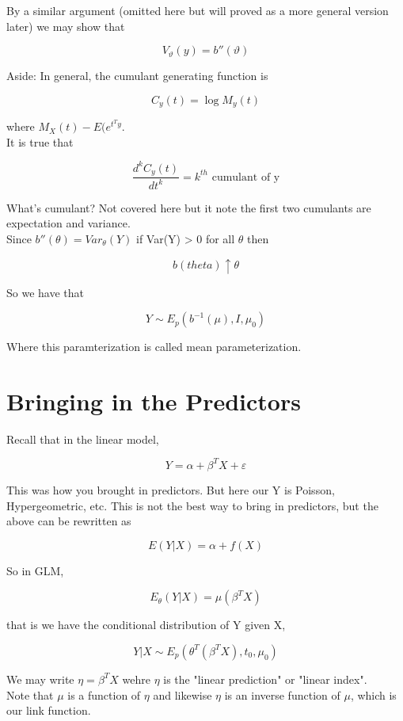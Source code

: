 \documentclass[11pt,fleqn]{book} %
\begin{document}
By a similar argument (omitted here but will proved as a more general version later) we may show that

		$$V_\vartheta(y) = b''(\vartheta) $$

Aside: In general, the cumulant generating function is 

		$$ C_y(t) = \log M_y(t)$$

where $M_X(t) - E(e^{t^T y}$.\\

It is true that

		$$\frac{d^k C_y(t)}{d t^k} = k^{th} \text{ cumulant of y} $$

What's cumulant? Not covered here but it note the first two cumulants are expectation and variance. \\


Since $b''(\theta) = Var_\theta(Y)$ if Var(Y) > 0 for all $\theta$ then 

		$$b(theta) \uparrow \theta $$

So we have that 

		$$ Y  \sim E_p (b^{-1}(\mu), I, \mu_0)$$

Where this paramterization is called mean parameterization.\\


\section{Bringing in the Predictors}


Recall that in the linear model, 
		
		$$Y = \alpha + \beta^T X + \varepsilon $$

This was how you brought in predictors. But here our Y is Poisson, Hypergeometric, etc. This is not the best way to bring in predictors, but the above can be rewritten as

		$$E(Y|X) = \alpha + f(X) $$

So in GLM, 
		
		$$E_\theta(Y|X) = \mu(\beta^T X) $$

that is we have the conditional distribution of Y given X,
		
		$$Y|X \sim E_p (\theta^T(\beta^T X), t_0, \mu_0)$$

We may write $\eta = \beta^T X$ wehre $\eta$ is the "linear prediction" or "linear index".\\

Note that $\mu$ is a function of $\eta$ and likewise $\eta$ is an inverse function of $\mu$, which is our link function. \\
\end{document}
